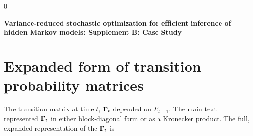 \documentclass[12pt]{article}
\newcommand{\blind}{0}
\begin{document}
\blind
{
  \bigskip
  \bigskip
  \bigskip
  \begin{center}
    {\LARGE\bf Variance-reduced stochastic optimization for efficient inference of hidden Markov models: Supplement B: Case Study}
  \end{center}
  \medskip
} \fi

\newpage
{} %

\section{Expanded form of transition probability matrices}

The transition matrix at time $t$, $\boldsymbol{\Gamma}_t$ depended on $E_{t-1}$. The main text represented $\boldsymbol{\Gamma}_t$ in either block-diagonal form or as a Kronecker product. The full, expanded representation of the $\boldsymbol{\Gamma}_t$ is
%
\end{document}
